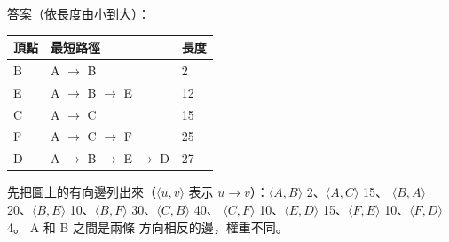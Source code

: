 \begin{pastsoln}
答案（依長度由小到大）：
\begin{center}
\begin{tabular}{lll}
\toprule
頂點 & 最短路徑 & 長度 \\
\midrule
B & A $\to$ B & 2 \\
E & A $\to$ B $\to$ E & 12 \\
C & A $\to$ C & 15 \\
F & A $\to$ C $\to$ F & 25 \\
D & A $\to$ B $\to$ E $\to$ D & 27 \\
\bottomrule
\end{tabular}
\end{center}

先把圖上的有向邊列出來（$\langle u, v\rangle$ 表示 $u \to v$）：$\langle A, B\rangle$ 2、$\langle A, C\rangle$ 15、
$\langle B, A\rangle$ 20、$\langle B, E\rangle$ 10、$\langle B, F\rangle$ 30、$\langle C, B\rangle$ 40、
$\langle C, F\rangle$ 10、$\langle E, D\rangle$ 15、$\langle F, E\rangle$ 10、$\langle F, D\rangle$ 4。 A 和 B 之間是兩條
方向相反的邊，權重不同。


\end{pastsoln}
